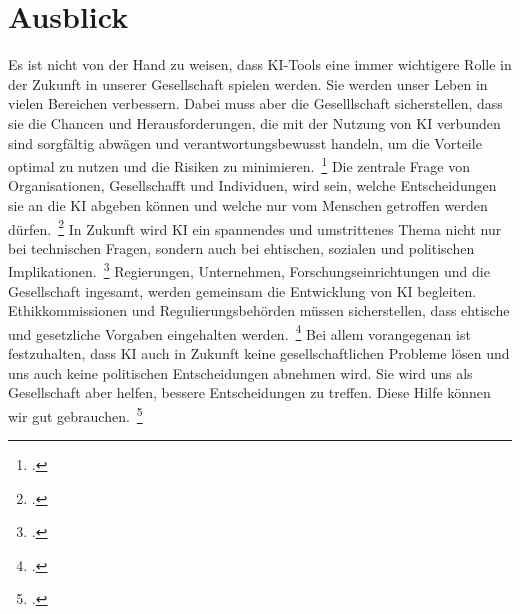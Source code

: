 \newpage
\section{Ausblick} \label{Ausblick}

Es ist nicht von der Hand zu weisen, dass \ac{KI}-Tools eine immer wichtigere Rolle in der Zukunft in unserer Gesellschaft spielen werden. Sie werden unser Leben in vielen Bereichen
verbessern. Dabei muss aber die Geselllschaft sicherstellen, dass sie die Chancen und Herausforderungen, die mit der Nutzung von {KI} verbunden sind sorgfältig abwägen
und verantwortungsbewusst handeln, um die Vorteile optimal zu nutzen und die Risiken zu minimieren.~\footcite[\vglf][]{Robot.2023} Die zentrale Frage von Organisationen,
Gesellschafft und Individuen, wird sein, welche Entscheidungen sie an die \ac{KI} abgeben können und welche nur vom Menschen getroffen werden dürfen.~\footcite[\vglf][]{Wittpahl.2018}
In Zukunft wird \ac{KI} ein spannendes und umstrittenes Thema nicht nur bei technischen Fragen, sondern auch bei ehtischen, sozialen und politischen Implikationen.~\footcite[\vglf][]{Robot.2023}
Regierungen, Unternehmen, Forschungseinrichtungen und die Gesellschaft ingesamt, werden gemeinsam die Entwicklung von \ac{KI} begleiten. Ethikkommissionen und Regulierungsbehörden müssen sicherstellen,
dass ehtische und gesetzliche Vorgaben eingehalten werden.~\footcite[\vglf][]{Robot.2023}
Bei allem vorangegenan ist festzuhalten, dass \ac{KI} auch in Zukunft keine gesellschaftlichen Probleme lösen und uns auch keine politischen Entscheidungen abnehmen wird.
Sie wird uns als Gesellschaft aber helfen, bessere Entscheidungen zu treffen. Diese Hilfe können wir gut gebrauchen.~\footcite[\vglf][]{Lenzen.2020}